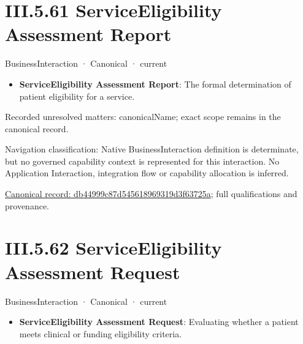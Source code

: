 \section*{III.5.61 ServiceEligibility Assessment Report}
\label{navigation:III.5.61}

\label{element:db44999c87d545618969319d3f63725a}
{\small BusinessInteraction · Canonical · current}\par

\begin{itemize}


\item \textbf{ServiceEligibility Assessment Report}: The formal determination of patient eligibility for a service.

\end{itemize}

{\small Recorded unresolved matters: canonicalName; exact scope remains in the canonical record.}\par
{\small Navigation classification: Native BusinessInteraction definition is determinate, but no governed capability context is represented for this interaction. No Application Interaction, integration flow or capability allocation is inferred.}\par
{\footnotesize \href{../../../../continuum/business/business-interaction/db44999c87d545618969319d3f63725a.md}{Canonical record: db44999c87d545618969319d3f63725a}; full qualifications and provenance.}\par
\section*{III.5.62 ServiceEligibility Assessment Request}
\label{navigation:III.5.62}

\label{element:1508d1e33b264534bbcde367eb3dc6a3}
{\small BusinessInteraction · Canonical · current}\par

\begin{itemize}


\item \textbf{ServiceEligibility Assessment Request}: Evaluating whether a patient meets clinical or funding eligibility criteria.

\end{itemize}

